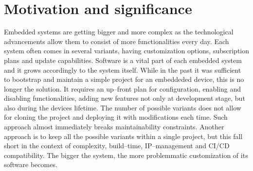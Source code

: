 \documentclass[preprint,12pt, a4paper]{elsarticle}
\begin{document}





\section{Motivation and significance}



Embedded systems are getting bigger and more complex as the technological advancements allow them to consist of more functionalities every day. Each system often comes in several variants, having customization options, subscription plans and update capabilities. Software is a vital part of each embedded system and it grows accordingly to the system itself. While in the past it was sufficient to bootstrap and maintain a simple project for an embeddeded device, this is no longer the solution. It requires an up--front plan for configuration, enabling and disabling functionalities, adding new features not only at development stage, but also during the devices lifetime. The number of possible variants does not allow for cloning the project and deploying it with modifications each time. Such approach almost immediately breaks maintainability constraints. Another approach is to keep all the possible variants within a single project, but this fall short in the context of complexity, build--time, IP--management and CI/CD compatibility. The bigger the system, the more problemmatic customization of its software becomes.
\end{document}
